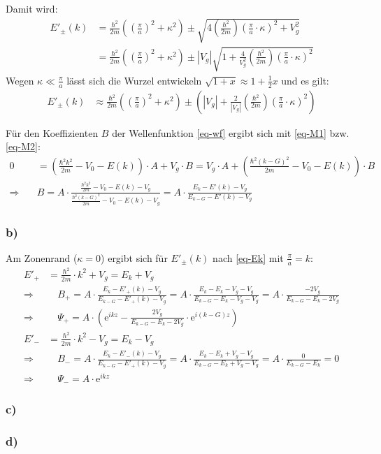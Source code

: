 Damit wird:
\begin{align}
\nonumber
  E'_\pm(k) &=\frac{\hbar^2}{2 m}\left(\left(\frac{\pi}{a}\right)^2 + \kappa^2\right)
  \pm \sqrt{4 \left(\frac{\hbar^2}{2 m}\right) \left(\frac{\pi}{a}\cdot \kappa \right)^2 + V_g^2}\\
\label{eq-Ek}
  & = \frac{\hbar^2}{2 m}\left(\left(\frac{\pi}{a}\right)^2 + \kappa^2\right)
  \pm |V_g|\sqrt{1 + \frac{4}{V_g^2}\left(\frac{\hbar^2}{2 m}\right) \left(\frac{\pi}{a}\cdot \kappa \right)^2 }
\end{align}
Wegen $\kappa \ll \frac{\pi}{a}$ lässt sich die Wurzel entwickeln
$\sqrt{1 + x} \approx 1 + \frac{1}{2}x$ und es gilt:
\begin{align}
  E'_\pm(k) &\approx \frac{\hbar^2}{2 m}\left(\left(\frac{\pi}{a}\right)^2 + \kappa^2\right)
  \pm  \left(|V_g| + \frac{2}{|V_g|}\left(\frac{\hbar^2}{2 m}\right) \left(\frac{\pi}{a}\cdot \kappa \right)^2 \right)
\end{align}

Für den Koeffizienten $B$ der Wellenfunktion \eqref{eq-wf} ergibt sich mit \eqref{eq-M1} bzw. \eqref{eq-M2}:
\begin{align}
\nonumber
0 &= \left(\frac{\hbar^2k^2}{2m}-V_0-E(k)\right)\cdot  A + V_g \cdot B =
V_g \cdot A + \left(\frac{\hbar^2(k-G)^2}{2m}-V_0-E(k)\right) \cdot B \\
\Rightarrow \quad & B = A \cdot \frac{\frac{\hbar^2k^2}{2m}-V_0-E(k)-V_g}
   {\frac{\hbar^2(k-G)^2}{2m}-V_0-E(k)-V_g}
= A \cdot \frac{E_k - E'(k)-V_g}{E_{k-G} - E'(k)-V_g}
\end{align}

\subsubsection*{b)}
Am Zonenrand ($\kappa = 0$) ergibt sich für $E'_\pm(k)$ nach \eqref{eq-Ek}
mit $\frac{\pi}{a} = k$:
\begin{align*}
  E'_+ &= \frac{\hbar^2}{2 m} \cdot k^2 + V_g = E_k + V_g \\
\Rightarrow & \quad  B_+ = A \cdot \frac{E_k - E'_+(k) - V_g}{E_{k-G}  - E'_+(k) - V_g} =
  A \cdot \frac{E_k - E_k - V_g - V_g}{E_{k-G}  - E_k - V_g - V_g} =
  A \cdot \frac{- 2 V_g}{E_{k-G} - E_k - 2 V_g} \\
\Rightarrow & \quad  \Psi_+ = A \cdot \left(\mathrm e^{i k z}
  - \frac{2 V_g}{E_{k-G} - E_k - 2 V_g} \cdot \mathrm e^{i (k-G) z}  \right) \\
  E'_- &= \frac{\hbar^2}{2 m} \cdot k^2 - V_g = E_k - V_g \\
\Rightarrow & \quad  B_- = A \cdot \frac{E_k - E'_-(k) - V_g}{E_{k-G}  - E'_+(k) - V_g} =
  A \cdot \frac{E_k - E_k + V_g - V_g}{E_{k-G}  - E_k + V_g - V_g} =
  A \cdot \frac{0}{E_{k-G}  - E_k} = 0 \\
\Rightarrow & \quad  \Psi_- = A \cdot \mathrm e^{i k z}
\end{align*}

\subsubsection*{c)}

\subsubsection*{d)}

